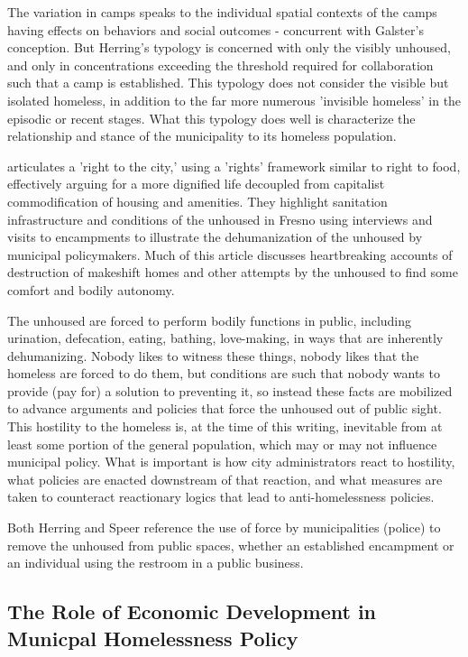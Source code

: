 The variation in camps speaks to the individual spatial contexts of
the camps having effects on behaviors and social outcomes - concurrent
with Galster's conception. But Herring's typology is concerned with
only the visibly unhoused, and only in concentrations exceeding the
threshold required for collaboration such that a camp is
established. This typology does not consider the visible but isolated
homeless, in addition to the far more numerous 'invisible homeless' in
the episodic or recent stages. What this typology does well is
characterize the relationship and stance of the municipality to its
homeless population.

\cite{speer2016RightInfrastructure} articulates a 'right to the city,'
using a 'rights' framework similar to right to food, effectively
arguing for a more dignified life decoupled from capitalist
commodification of housing and amenities. They highlight sanitation
infrastructure and conditions of the unhoused in Fresno using
interviews and visits to encampments to illustrate the dehumanization
of the unhoused by municipal policymakers. Much of this article
discusses heartbreaking accounts of destruction of makeshift homes and
other attempts by the unhoused to find some comfort and bodily
autonomy.

The unhoused are forced to perform bodily functions in public,
including urination, defecation, eating, bathing, love-making, in ways
that are inherently dehumanizing. Nobody likes to witness these
things, nobody likes that the homeless are forced to do them, but
conditions are such that nobody wants to provide (pay for) a solution
to preventing it, so instead these facts are mobilized to advance arguments and
policies that force the unhoused out of public sight. This hostility
to the homeless is, at the time of this writing, inevitable from at
least some portion of the general population, which may or may not
influence municipal policy. What is important is how city
administrators react to hostility, what policies are enacted
downstream of that reaction, and what measures are taken to
counteract reactionary logics that lead to anti-homelessness policies.

Both Herring and Speer reference the use of force by municipalities
(police) to remove the unhoused from public spaces, whether an
established encampment or an individual using the restroom in a public
business.

\subsection{The Role of Economic Development in Municpal Homelessness Policy}


